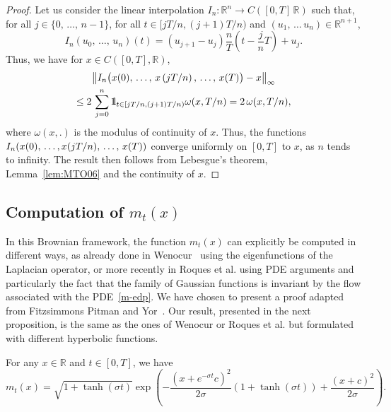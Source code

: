 \documentclass[10pt]{amsart}
\theoremstyle{definition}\newtheorem{defi}[theo]{Definition}\newtheorem{rema}[theo]{Remark}\newtheorem{exam}[theo]{Example}\newtheorem{exem}[theo]{Example}\newtheorem{nota}[theo]{Notation}
\newcommand*\R{\mathbb{R}}
\newcommand*\ind{{\mathchoice {\rm 1\mskip-4mu l} {\rm 1\mskip-4mu l} {\rm 1\mskip-4.5mu l} {\rm 1\mskip-5mu l}}}
\begin{document}
\begin{proof}
Let us consider the linear interpolation $I_{n}:\R^{n}\to C([0,T]\,\R)$ such that, for all $j\in\{0,\,\ldots,\,n-1\}$, for all $t\in[jT/n,(j+1)T/n)$ and $(u_1,\,\dots\,u_n)\in \R^{n+1}$,
\[
I_{n}\left(u_{0},\,\ldots,\,u_{n}\right)(t)=\left(u_{j+1}-u_{j}\right)\frac{n}{T}\left(t-\frac{j}{n}T\right)+u_{j}.
\]
Thus, we have for $x\in C([0,T],\R)$,
\begin{multline}
\left\|I_{n}\big(x(0),\,\ldots,\,x\left(jT/n\right),\,\ldots,\,x(T)\big)-x\right\|_\infty\\
\leq 2\, \sum_{j=0}^{n}\ind_{t \in \left[jT/n, (j+1)T/n\right)}\omega(x,T/n)= 2\, \omega(x, T/n),
\end{multline}
where $\omega(x,.)$ is the modulus of continuity of $x$. Thus, the functions $I_{n}(x(0),\,\ldots,\linebreak x(jT/n),\,\ldots,\,x(T))$ converge uniformly on $[0,T]$ to $x$, as $n$ tends to infinity. The result then follows from Lebesgue's theorem, Lemma~\ref{lem:MTO06} and the continuity of $x$.
\end{proof}

\subsection{Computation of \texorpdfstring{$m_{t}(x)$}{mt(x)}}
In this Brownian framework, the function $m_t(x)$ can explicitly be computed in different ways, as already done in Wenocur~\cite{wenocur86} using the eigenfunctions of the Laplacian operator, or more recently in Roques et al. \cite{roques20} using PDE arguments and particularly the fact that the family of Gaussian functions is invariant by the flow associated with the PDE~\eqref{m-edp}. We have chosen to present a proof adapted from Fitzsimmons Pitman and Yor~\cite{fitzsimmons1993markovian}. Our result, presented in the next proposition, is the same as the ones of Wenocur or Roques et al. but formulated with different hyperbolic functions.

\begin{prop}\label{prop:mtx}
For any $x\in \R$ and $t\in [0,T]$, we have
\begin{equation}\label{def:m}
m_{t}(x)=\sqrt{1+\tanh(\sigma t)}\exp\left(-\frac{\left(x+e^{-\sigma t}c \right)^2}{2\sigma}\left(1+\tanh(\sigma t) \right)+\frac{(x+c)^2}{2\sigma} \right).
\end{equation}
\end{prop}
\end{document}
